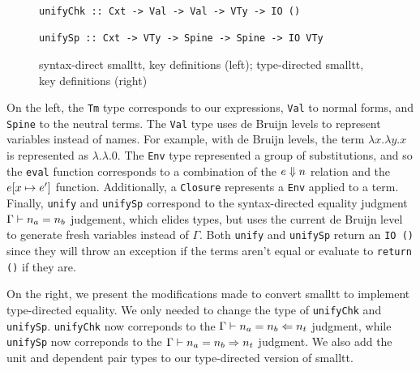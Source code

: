 \begin{figure*}
\begin{minipage}[t]{.54\textwidth}
\begin{leftbar}
\begin{lstlisting}
unifyChk :: Cxt -> Val -> Val -> VTy -> IO ()

unifySp :: Cxt -> VTy -> Spine -> Spine -> IO VTy
\end{lstlisting}
\end{leftbar}
\end{minipage}
\caption{syntax-direct smalltt, key definitions (left); type-directed smalltt, key definitions (right)}
\label{fig:smalltt}
\end{figure*}

On the left, the \lstinline{Tm} type corresponds to our expressions, \lstinline{Val} to normal forms, and \lstinline{Spine} to the neutral terms.
The \lstinline{Val} type uses de Bruijn levels to represent variables instead of names.
For example, with de Bruijn levels, the term $\lambda x. \lambda y. x$ is represented as $\lambda. \lambda. 0$.
The \lstinline{Env} type represented a group of substitutions, and so the \lstinline{eval} function corresponds to a combination of the $e \Downarrow n$ relation and the $e [x \mapsto e']$ function.
Additionally, a \lstinline{Closure} represents a \lstinline{Env} applied to a term.
Finally, \lstinline{unify} and \lstinline{unifySp} correspond to the syntax-directed equality judgment $\Gamma \vdash n_a = n_b$ judgement, which elides types, but uses the current de Bruijn level to generate fresh variables instead of $\Gamma$.
Both \lstinline{unify} and \lstinline{unifySp} return an \lstinline{IO ()} since they will throw an exception if the terms aren't equal or evaluate to \lstinline{return ()} if they are.

On the right, we present the modifications made to convert smalltt to implement type-directed equality.
We only needed to change the type of \lstinline{unifyChk} and \lstinline{unifySp}.
\lstinline{unifyChk} now correponds to the $\Gamma \vdash n_a = n_b \Leftarrow n_t$ judgment, while \lstinline{unifySp} now correponds to the $\Gamma \vdash n_a = n_b \Rightarrow n_t$ judgment.
We also add the unit and dependent pair types to our type-directed version of smalltt.


